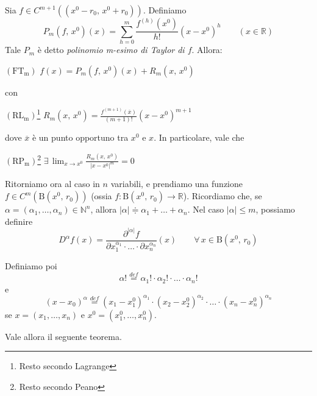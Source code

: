 \begin{thm}[Formula di Taylor con resto secondo Lagrange ($n=1$)]
Sia $f \in C^{m+1}((x^0-r_0,\,x^0+r_0))$. Definiamo
$$
P_m(f,\,x^0)(x) = \sum_{h=0}^{m} \frac{f^{(h)}(x^0)}{h!}(x-x^0)^h
\qquad (x \in \mathbb{R})
$$
Tale $P_m$ è detto \emph{polinomio m-esimo di Taylor di $f$}. Allora:
\begin{center}
$\mathrm{(FT_m)}$
\hfill
$\displaystyle f(x) = P_m(f,\,x^0)(x)+R_m(x,\,x^0)$
\hfill \null \\
\end{center}
con
\begin{center}
$\mathrm{(RL_m)}$\footnote{Resto secondo Lagrange}
\hfill
$\displaystyle R_m(x,\,x^0) = \frac{f^{(m+1)}(\overline{x})}{(m+1)!}(x-x^0)^{m+1}$
\hfill \null \\
\end{center}
dove $\overline{x}$ è un punto opportuno tra $x^0$ e $x$. In particolare, vale che
\begin{center}
$\mathrm{(RP_m)}$\footnote{Resto secondo Peano}
\hfill
$\displaystyle \exists \, \lim_{x \rightarrow x^0} \frac{R_m(x,\,x^0)}{|x-x^0|^m} = 0$
\hfill \null \\
\end{center}
\end{thm}

Ritorniamo ora al caso in $n$ variabili, e prendiamo una funzione $f \in C^m(\mathrm{B}(x^0,\,r_0))$ (ossia $f : \mathrm{B}(x^0,\,r_0) \rightarrow \mathbb{R}$). Ricordiamo che, se $\alpha = (\alpha_1,\ldots,\alpha_n) \in \mathbb{N}^n$, allora $|\alpha| \doteqdot \alpha_1 + \ldots + \alpha_n$. Nel caso $|\alpha| \leq m$, possiamo definire
$$
D^{\alpha} f(x) = \frac{\partial^{|\alpha|}f}{\partial x_1^{\alpha_1} \cdot \ldots \cdot \partial x_n^{\alpha_n}}(x) \qquad \forall \, x \in \mathrm{B}(x^0,\,r_0)
$$

Definiamo poi
$$
\alpha! \overset{def}{=} \alpha_1! \cdot \alpha_2! \cdot \ldots \cdot \alpha_n!
$$
e
$$
(x-x_0)^{\alpha} \overset{def}{=} (x_1-x_1^0)^{\alpha_1} \cdot (x_2-x_2^0)^{\alpha_2} \cdot \ldots \cdot (x_n-x_n^0)^{\alpha_n}
$$
se $x=(x_1,\ldots,x_n)$ e $x^0=(x_1^0,\ldots,x_n^0)$.

Vale allora il seguente teorema.

